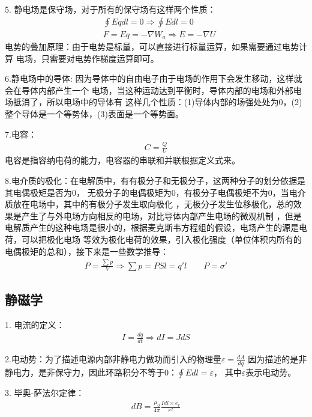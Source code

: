\documentclass[UTF8]{article}
\numberwithin{equation}{section}
\begin{document}
5. 静电场是保守场，对于所有的保守场有这样两个性质：
\begin{align*}
    &\oint Eq dl =0\Rightarrow \oint E dl =0\\
    &F=Eq=-\nabla W_a \Rightarrow E=-\nabla U
\end{align*}
电势的叠加原理：由于电势是标量，可以直接进行标量运算，如果需要通过电势计算
电场，只需要对电势作梯度运算即可。

6.静电场中的导体:
因为导体中的自由电子由于电场的作用下会发生移动，这样就会在导体内部产生一个
电场，当这种运动达到平衡时，导体内部的电场和外部电场抵消了，所以电场中的导体有
这样几个性质：(1)导体内部的场强处处为0，(2)整个导体是一个等势体，(3)表面是一个等势面。

7.电容：
\begin{align*}
    C=\frac{Q}{U}
\end{align*}
电容是指容纳电荷的能力，电容器的串联和并联根据定义式来。

8.电介质的极化：在电解质中，有有极分子和无极分子，这两种分子的划分依据是其电偶极矩是否为0，
无极分子的电偶极矩为0，有极分子电偶极矩不为0，当电介质放在电场中，其中的有极分子发生取向极化
，无极分子发生位移极化，总的效果是产生了与外电场方向相反的电场，对比导体内部产生电场的微观机制
，但是电解质产生的这种电场是很小的，根据麦克斯韦方程组的假设，电场产生的源是电荷，可以把极化电场
等效为极化电荷的效果，引入极化强度（单位体积内所有的电偶极矩的总和），接下来是一些数学推导：
\begin{align*}
    P=\frac{\sum p}{V}\Rightarrow \sum p = PSl=q'l\qquad P=\sigma'
\end{align*}
\subsection{静磁学}
1. 电流的定义：
\begin{align*}
    I=\frac{dq}{dt}\Rightarrow dI=JdS
\end{align*}

2.电动势：为了描述电源内部非静电力做功而引入的物理量$\varepsilon=\frac{dA}{dq}$
因为描述的是非静电力，是非保守力，因此环路积分不等于0：$\oint E dl =\varepsilon$，
其中$\varepsilon$表示电动势。

3. 毕奥-萨法尔定律：
\begin{align*}
    dB=\frac{\mu_0}{4\pi}\frac{Idl\times e_r}{r^2}
\end{align*}
\end{document}
